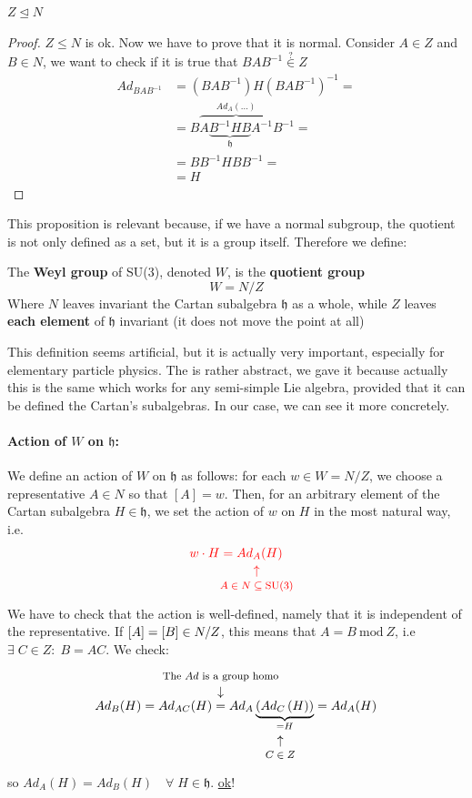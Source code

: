\documentclass[../main.tex]{subfiles}
\begin{document}
\begin{proposition}
$Z\trianglelefteq N$
\end{proposition}
\begin{proof} $Z\leq N$ is ok. Now we have to prove that it is normal. Consider $A\in Z$ and $B\in N$, we want to check if it is true that $BAB^{-1}\overset{?}{\in}Z$
\begin{align*}
Ad_{BAB^{-1}}&=\left(BAB^{-1}\right)H\left(BAB^{-1}\right)^{-1}=\\
&=B\overbrace{A\underbrace{B^{-1}HB}_{\mathfrak{h}}A^{-1}}^{Ad_A(\dots)}B^{-1}=\\
&=BB^{-1}HBB^{-1}=\\
&=H
\end{align*}
\end{proof}
This proposition is relevant because, if we have a normal subgroup, the quotient is not only defined as a set, but it is a group itself. Therefore we define:
\begin{definition}
The \textbf{Weyl group} of SU(3), denoted $W$, is the\textbf{ quotient group}
\[
W=N/Z
\]
Where $N$ leaves invariant the Cartan subalgebra $\mathfrak{h}$ as a whole, while $Z$ leaves \textbf{each element} of $\mathfrak{h}$ invariant (it does not move the point at all)
\end{definition}This definition seems artificial, but it is actually very important, especially for elementary particle physics. The  is rather abstract, we gave it because actually this is the same which works for any semi-simple Lie algebra, provided that it can be defined the Cartan's subalgebras. In our case, we can see it more concretely.
\paragraph{Action of $W$ on $\mathfrak{h}$:} We define an action of $W$ on $\mathfrak{h}$ as follows: for each $w\in W=N/Z$, we choose a representative $A\in N$ so that $[A]=w$. Then, for an arbitrary element of the Cartan subalgebra $H\in\mathfrak{h}$, we set the action of $w$ on $H$ in the most natural way, i.e.
\[
{\color{red}w\cdot H=Ad_{\underset{\mathclap{\tikz \node {$\uparrow$} node [below=1ex] {\footnotesize $A\in N\subseteq \textrm{SU}(3)$};}}{A}}(H)}
\]
We have to check that the action is well-defined, namely that it is independent of the representative. If $\bqty{A}=\bqty{B}\in N/Z$, this means that $A=B \ \textrm{mod}\ Z$, i.e $\exists\;C\in Z:\;B=AC$. We check:
\[
Ad_B(H)=Ad_{AC}(H)\overset{\mathclap{\tikz \node {$\downarrow$} node [above=1.25ex] {\footnotesize The $Ad$ is a group homo};}}{=}Ad_A\underbrace{\left(Ad_C\left(H\right)\right)}_{\underset{\mathclap{\tikz \node {$\uparrow$} node [below=1ex] {\footnotesize $C\in Z$};}}{=}H}=Ad_A(H)
\]
so $Ad_A(H)=Ad_B(H)\quad \forall\;H\in\mathfrak{h}$. \underline{ok}!
\end{document}
